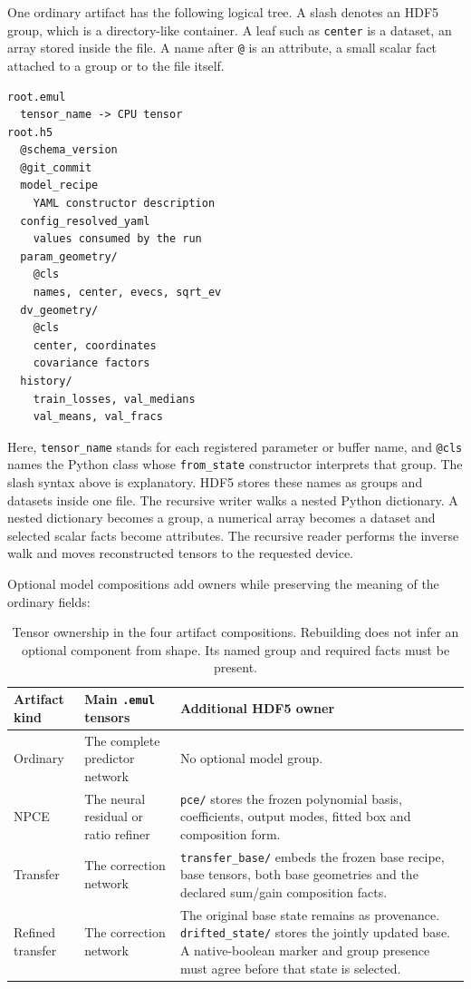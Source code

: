 \documentclass[10pt,aps,prd,twocolumn,nofootinbib]{revtex4-2}
\newcommand{\code}[1]{\texttt{#1}}
\begin{document}
One ordinary artifact has the following logical tree.  A slash denotes an
HDF5 group, which is a directory-like container.  A leaf such as
\code{center} is a dataset, an array stored inside the file.  A name after
\code{@} is an attribute, a small scalar fact attached to a group or to the
file itself.
\begin{verbatim}
root.emul
  tensor_name -> CPU tensor
root.h5
  @schema_version
  @git_commit
  model_recipe
    YAML constructor description
  config_resolved_yaml
    values consumed by the run
  param_geometry/
    @cls
    names, center, evecs, sqrt_ev
  dv_geometry/
    @cls
    center, coordinates
    covariance factors
  history/
    train_losses, val_medians
    val_means, val_fracs
\end{verbatim}
Here, \code{tensor\_name} stands for each registered parameter or buffer name,
and \code{@cls} names the Python class whose \code{from\_state} constructor
interprets that group.  The slash syntax above is explanatory.  HDF5 stores
these names as groups and datasets inside one file.
The recursive writer walks a nested Python dictionary.  A nested dictionary
becomes a group, a numerical array becomes a dataset and selected scalar
facts become attributes.  The recursive reader performs the inverse walk and
moves reconstructed tensors to the requested device.

Optional model compositions add owners while preserving the meaning of the
ordinary fields:
\begin{table}[t]
\centering
\begin{tabular}{p{}p{}p{}}
\toprule
Artifact kind & Main \code{.emul} tensors & Additional HDF5 owner \\
\midrule
Ordinary & The complete predictor network & No optional model group.  \\
NPCE & The neural residual or ratio refiner & \code{pce/} stores the frozen
polynomial basis, coefficients, output modes, fitted box and composition
form.  \\
Transfer & The correction network & \code{transfer\_base/} embeds the frozen
base recipe, base tensors, both base geometries and the declared sum/gain
composition facts.  \\
Refined transfer & The correction network & The original base state remains
as provenance.  \code{drifted\_state/} stores the jointly updated base.  A
native-boolean marker and group presence must agree before that state is
selected.  \\
\bottomrule
\end{tabular}
\caption{Tensor ownership in the four artifact compositions.  Rebuilding
does not infer an optional component from shape.  Its named group and required
facts must be present.}
\end{table}
\end{document}
